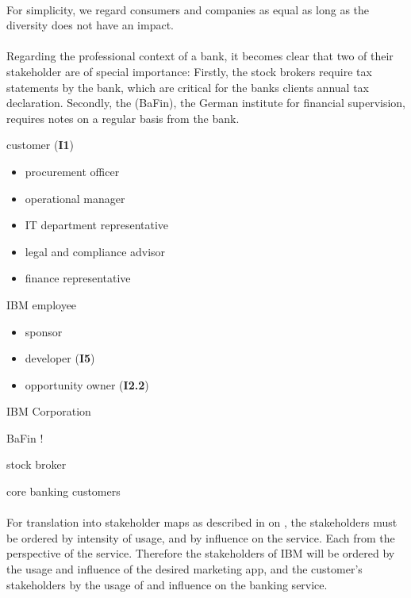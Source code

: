 \paragraph{} For simplicity, we regard consumers and companies as equal as long as the diversity does not have an impact.

\paragraph{}
Regarding the professional context of a bank, it becomes clear that two of their stakeholder are of special importance: Firstly, the stock brokers require tax statements by the bank, which are critical for the banks clients annual tax declaration. Secondly, the  (BaFin), the German institute for financial supervision, requires notes on a regular basis from the bank.


\vspace{2em}


\begin{closeItemCol}
    \item customer (\textbf{I1})
    \begin{itemize}
        \item procurement officer
        \item operational manager
        \item IT department representative
        \item legal and compliance advisor
        \item finance representative
    \end{itemize}
    \item IBM employee 
    \begin{itemize}
        \item sponsor
        \item developer (\textbf{I5})
        \item opportunity owner (\textbf{I2.2})
    \end{itemize}
    \item IBM Corporation
    \columnbreak
    \item BaFin !
    \item stock broker
    \item core banking customers
\end{closeItemCol}

\paragraph{}
For translation into stakeholder maps as described in \Cref{} on \cpageref{}, the stakeholders must be ordered by intensity of usage, and by influence on the service. Each from the perspective of the service. Therefore the stakeholders of IBM will be ordered by the usage and influence of the desired marketing app, and the customer's stakeholders by the usage of and influence on the banking service.

